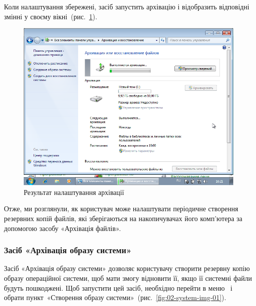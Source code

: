 \documentclass[
	a4paper,
	oneside,
	BCOR = 10mm,
	DIV = 12,
	12pt,
	headings = normal,
]{scrartcl}
\begin{document}
				Коли налаштування збережені, засіб запустить архівацію і відобразить відповідні змінні у своєму вікні~(рис.~\ref{fig:01-archivation-06}).

				\begin{figure}[!htbp]
					\centering
					\includegraphics[height=12\baselineskip]{./assets/y04s01-infosec-lab-01-03-p06.png}
					\caption{Результат налаштування архівації}
					\label{fig:01-archivation-06}
				\end{figure}

				Отже, ми розглянули, як користувач може налаштувати періодичне створення резервних копій файлів, які зберігаються на накопичувачах його комп'ютера за допомогою засобу «Архівація файлів».

			\subsubsection{Засіб «Архівація образу системи»}
				Засіб «Архівація образу системи» дозволяє користувачу створити резервну копію образу операційної системи, щоб мати змогу відновити її, якщо її системні файли будуть пошкоджені. Щоб запустити цей засіб, необхідно перейти в меню~ і обрати пункт~«Створення образу системи»~(рис.~\ref{fig:02-system-img-01}).
\end{document}
